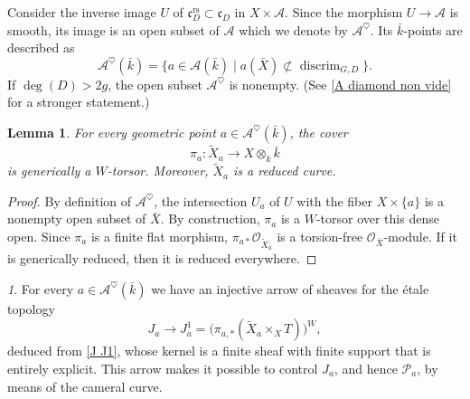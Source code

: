 \documentclass[12pt,english]{smfart}
\numberwithin{equation}{subsection}
\newtheorem{lemma}[equation]{Lemma}
\theoremstyle{remark}
\newtheorem{numero}[equation]{}
\newcommand\calA{{\mathscr A}}
\newcommand\calP{{\mathscr P}}
\begin{document}
Consider the inverse image $U$ of $\mathfrak{c}^\mathrm{rs}_D\subset \mathfrak{c}_D$ in $X\times\mathcal{A}$.
Since the morphism $U\to\mathcal{A}$ is smooth, its image is an open subset of $\mathcal{A}$ which we denote by $\mathcal{A}^\heartsuit$.
Its $\bar{k}$-points are described as
$$
\mathcal{A}^\heartsuit(\bar{k})=\{a\in\mathcal{A}(\bar{k})\mid a(\bar{X})\not\subset \operatorname{discrim}_{G,D}\}.
$$
If $\deg(D)>2g$, the open subset $\mathcal{A}^\heartsuit$ is nonempty. (See \ref{A diamond non vide} for a stronger statement.)

\begin{lemma}
For every geometric point $a\in \mathcal{A}^\heartsuit(\bar{k})$, the cover
$$
\pi_a:\widetilde{X}_a\longrightarrow X\otimes_k \bar{k}
$$
is generically a $W$-torsor. Moreover, $\widetilde{X}_a$ is a reduced curve.
\end{lemma}

\begin{proof}
By definition of $\mathcal{A}^\heartsuit$, the intersection $U_a$ of $U$ with the fiber $X\times \{a\}$ is a nonempty open subset of $\bar{X}$. By construction, $\pi_a$ is a $W$-torsor over this dense open. Since $\pi_a$ is a finite flat morphism, $\pi_{a*}\mathcal{O}_{\widetilde{X}_a}$ is a torsion-free $\mathcal{O}_{\bar{X}}$-module. If it is generically reduced, then it is reduced everywhere.
\end{proof}

\begin{numero}\label{J a J1 a}
For every $a\in\calA^\heartsuit(\bar k)$ we have an injective arrow of sheaves for the \'etale topology
$$J_a\rightarrow J^1_a=\big(\pi_{a,*}(\widetilde X_a\times_X T)\big)^W,$$
deduced from \ref{J J1}, whose kernel is a finite sheaf with finite support that is entirely explicit. This arrow makes it possible to control $J_a$, and hence $\calP_a$, by means of the cameral curve.
\end{numero}
\end{document}
